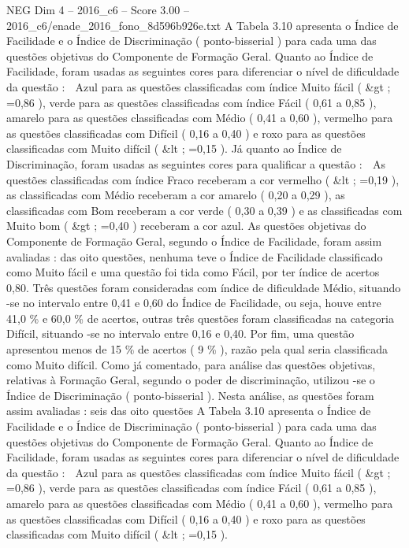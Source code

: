 \begin{textsample}{NEG Dim 4 – 2016\_c6 – Score 3.00 – 2016\_c6/enade\_2016\_fono\_8d596b926e.txt}
A Tabela 3.10 apresenta o Índice de Facilidade e o Índice de Discriminação ( ponto-bisserial ) para cada uma das questões objetivas do Componente de Formação Geral.
Quanto ao Índice de Facilidade, foram usadas as seguintes cores para diferenciar o nível de dificuldade da questão :  Azul para as questões classificadas com índice Muito fácil ( \&gt ; =0,86 ), verde para as questões classificadas com índice Fácil ( 0,61 a 0,85 ), amarelo para as questões classificadas com Médio ( 0,41 a 0,60 ), vermelho para as questões classificadas com Difícil ( 0,16 a 0,40 ) e roxo para as questões classificadas com Muito difícil ( \&lt ; =0,15 ).
Já quanto ao Índice de Discriminação, foram usadas as seguintes cores para qualificar a questão :  As questões classificadas com índice Fraco receberam a cor vermelho ( \&lt ; =0,19 ), as classificadas com Médio receberam a cor amarelo ( 0,20 a 0,29 ), as classificadas com Bom receberam a cor verde ( 0,30 a 0,39 ) e as classificadas com Muito bom ( \&gt ; =0,40 ) receberam a cor azul.
As questões objetivas do Componente de Formação Geral, segundo o Índice de Facilidade, foram assim avaliadas : das oito questões, nenhuma teve o Índice de Facilidade classificado como Muito fácil e uma questão foi tida como Fácil, por ter índice de acertos 0,80.
Três questões foram consideradas com índice de dificuldade Médio, situando -se no intervalo entre 0,41 e 0,60 do Índice de Facilidade, ou seja, houve entre 41,0 \% e 60,0 \% de acertos, outras três questões foram classificadas na categoria Difícil, situando -se no intervalo entre 0,16 e 0,40.
Por fim, uma questão apresentou menos de 15 \% de acertos ( 9 \% ), razão pela qual seria classificada como Muito difícil.
Como já comentado, para análise das questões objetivas, relativas à Formação Geral, segundo o poder de discriminação, utilizou -se o Índice de Discriminação ( ponto-bisserial ).
Nesta análise, as questões foram assim avaliadas : seis das oito questões A Tabela 3.10 apresenta o Índice de Facilidade e o Índice de Discriminação ( ponto-bisserial ) para cada uma das questões objetivas do Componente de Formação Geral.
Quanto ao Índice de Facilidade, foram usadas as seguintes cores para diferenciar o nível de dificuldade da questão :  Azul para as questões classificadas com índice Muito fácil ( \&gt ; =0,86 ), verde para as questões classificadas com índice Fácil ( 0,61 a 0,85 ), amarelo para as questões classificadas com Médio ( 0,41 a 0,60 ), vermelho para as questões classificadas com Difícil ( 0,16 a 0,40 ) e roxo para as questões classificadas com Muito difícil ( \&lt ; =0,15 ).

\end{textsample}
